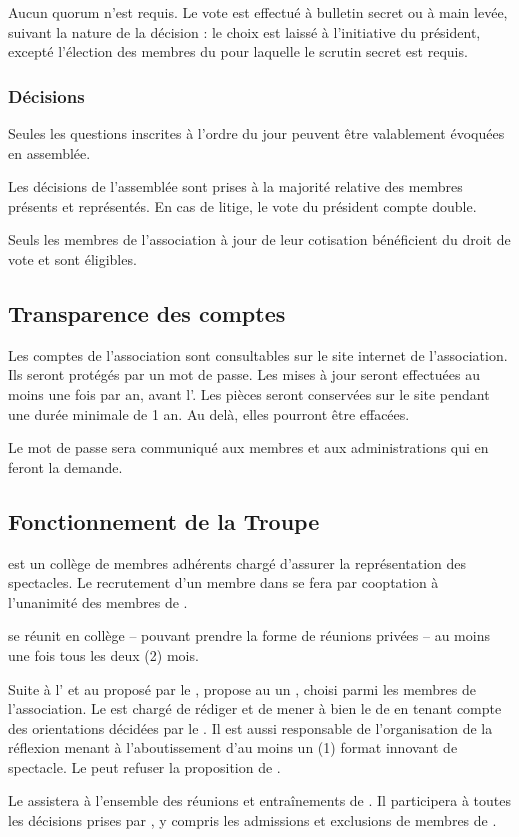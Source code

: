 \documentclass[a4paper,french,10pt]{article}
\newcommand{\article}[1]{\subsection{#1}\addtocounter{article}{1}}
\newcounter{article}
\begin{document}
Aucun quorum n'est requis. Le vote est effectué à bulletin secret ou à
main levée, suivant la nature de la décision : le choix est laissé à
l'initiative du président, excepté l'élection des membres du \bureau{}
pour laquelle le scrutin secret est requis.


\subsubsection*{Décisions}

Seules les questions inscrites à l’ordre du jour peuvent être
valablement évoquées en assemblée.

Les décisions de l’assemblée sont prises à la majorité relative des
membres présents et représentés. En cas de litige, le vote du
président compte double.

Seuls les membres de l’association à jour de leur cotisation
bénéficient du droit de vote et sont éligibles.

\article{Transparence des comptes}
\label{sec:transp-des-compt}
Les comptes de l'association sont consultables sur le site internet de l'association. Ils seront protégés par un mot de passe. Les mises à jour seront effectuées au moins une fois par an, avant l'\AGO{}. Les pièces seront conservées sur le site pendant une durée minimale de 1 an. Au delà, elles pourront être effacées.

Le mot de passe sera communiqué aux membres et aux administrations qui en feront la demande.

\article{Fonctionnement de la Troupe}
\label{sec:fonctionnement-troupe}
\troupe{} est un collège de membres adhérents chargé d'assurer la représentation des spectacles. Le recrutement d'un membre dans \troupe{} se fera par cooptation à l'unanimité des membres de \troupe{}.

 \troupe{} se réunit en collège -- pouvant prendre la forme de réunions privées -- au moins une fois tous les deux (2) mois.

Suite à l'\AGO{} et au \PA{} proposé par le \bureau{}, \troupe{} propose au \bureau{} un \DA{}, choisi parmi les membres de l'association. Le \DA{} est chargé de rédiger et de mener à bien le \PA{} de \troupe{} en tenant compte des orientations décidées par le \bureau{}. Il est aussi responsable de l'organisation de la réflexion menant à l'aboutissement d'au moins un (1) format innovant de spectacle. Le \bureau{} peut refuser la proposition de \troupe{}. 

Le \DA{} assistera à l'ensemble des réunions et entraînements de \troupe{}. Il participera à toutes les décisions prises par \troupe{}, y compris les admissions et exclusions de membres de \troupe{}.
\end{document}
